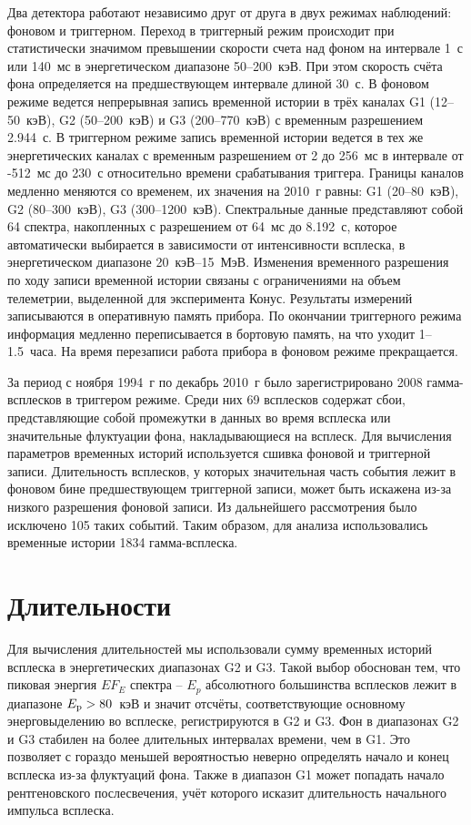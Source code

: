 Два детектора работают независимо друг от друга в двух режимах наблюдений: 
фоновом и триггерном. Переход в триггерный режим происходит при статистически 
значимом превышении скорости счета над фоном на интервале 1~с или 140~мс в 
энергетическом диапазоне 50--200~кэВ. При этом скорость счёта фона определяется 
на предшествующем интервале длиной 30~с. В фоновом режиме ведется непрерывная 
запись временной истории в трёх каналах G1 (12--50~кэВ), G2 (50--200~кэВ) и G3 (200--770~кэВ) 
с временным разрешением 2.944~с. В триггерном режиме запись временной истории ведется 
в тех же энергетических каналах с временным разрешением от 2 до 256~мс в интервале 
от -512~мс до 230~с относительно времени срабатывания триггера. Границы каналов 
медленно меняются со временем, их значения на 2010~г равны: G1 (20--80~кэВ), 
G2 (80--300~кэВ), G3 (300--1200~кэВ). Спектральные данные представляют собой 64 спектра, 
накопленных с разрешением от 64~мс до 8.192~с, которое автоматически выбирается 
в зависимости от интенсивности всплеска, в энергетическом диапазоне 20~кэВ--15~МэВ. 
Изменения временного разрешения по ходу записи временной истории связаны с 
ограничениями на объем телеметрии, выделенной для эксперимента Конус. Результаты 
измерений записываются в оперативную память прибора. По окончании триггерного 
режима информация медленно переписывается в бортовую память, на что уходит 1--1.5~часа. 
На время перезаписи работа прибора в фоновом режиме прекращается.

За период с ноября 1994~г по декабрь 2010~г было зарегистрировано 2008 гамма-всплесков 
в триггером режиме. Среди них 69 всплесков содержат сбои, представляющие собой 
промежутки в данных во время всплеска или значительные флуктуации фона, 
накладывающиеся на всплеск. Для вычисления параметров временных историй используется 
сшивка фоновой и триггерной записи. Длительность всплесков, у которых значительная 
часть события лежит в фоновом бине предшествующем триггерной записи, может быть 
искажена из-за низкого разрешения фоновой записи. Из дальнейшего рассмотрения 
было исключено 105 таких событий. Таким образом, для анализа использовались временные 
истории 1834 гамма-всплеска. 

\section{Длительности}\label{sec:Durations}
Для вычисления длительностей мы использовали сумму временных историй всплеска 
в энергетических диапазонах G2 и G3. Такой выбор обоснован тем, что  пиковая 
энергия $E F_{E}$ спектра -- $E_p$ абсолютного большинства всплесков лежит в 
диапазоне $E_{{\mathrm{p}}}>80$~кэВ и значит отсчёты, соответствующие  основному энерговыделению 
во всплеске, регистрируются в G2 и G3. Фон в диапазонах G2 и G3 стабилен на более 
длительных интервалах времени, чем в G1. Это позволяет с гораздо меньшей вероятностью 
неверно определять начало и конец всплеска из-за флуктуаций фона. Также в диапазон G1 
может попадать начало рентгеновского послесвечения, учёт которого исказит 
длительность начального импульса всплеска.

